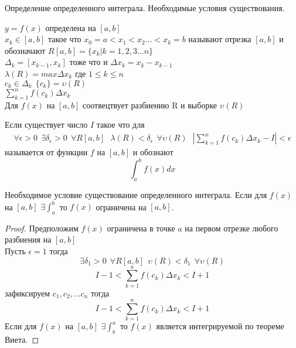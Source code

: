 \begin{title}
  Определение определенного интеграла. Необходимые условия существования.
\end{title}

$y = f(x)$ определена на $[a,b]$\\
$x_k \in [a,b]$ такое что $x_0 = a < x_1 < x_2 \ldots < x_k = b$ называют
 отрезка $[a,b]$ и обозначают $R[a,b] =
\{x_k | k = 1,2,3 \ldots n\}$\\
$\Delta_k = [x_{k-1}, x_k]$ тоже что и $\Delta{x_k} = x_k - x_{k-1}$\\
$\lambda(R) = max\Delta x_k$ где $1 \le k \le n$ \\
$c_k \in \Delta_k ~~ \{c_k\} = \upsilon(R)$ \\
$\sum_{k=1}^{n} f(c_k)\Delta x_k$ \\

Для $f(x)$ на $[a,b]$ соотвецтвует разбиению R и выборке $\upsilon(R)$\\

\begin{defin}
  Если существует число $I$ такое что для
  \begin{eqnarray*}
    \forall\epsilon>0 ~~ \exists\delta_{\epsilon}>0 ~~ \forall R[a,b] ~~~
    \lambda(R)<\delta_{\epsilon} ~~ \forall\upsilon(R) ~~~
    \left| \sum_{k=1}^{n} f(c_k)\Delta x_k - I \right| < \epsilon
  \end{eqnarray*}
  называется  от функции $f$ на $[a,b]$ и обознают
  $$\int_{a}^{b} f(x)dx$$
\end{defin}

\begin{theorem}
  Необходимое условие существование определенного интеграла. Если для $f(x)$
  на $[a,b]$ $\exists \int_{a}^{b}$ то $f(x)$ ограничена на $[a,b]$.
\end{theorem}

\begin{proof}
  Предположим $f(x)$ ограничена в точке $a$ на первом отрезке любого разбиения
  на $[a,b]$\\
  Пусть $\epsilon = 1$ тогда \[\exists \delta_1 > 0 ~~ \forall R[a,b] ~~
  \upsilon(R) < \delta_1 ~~ \forall \upsilon(R)\]
  \[I-1 < \sum_{k=1}^{n} f(c_k)\Delta x_k < I+1\] зафиксируем $c_1, c_2, \ldots c_n$
  тогда \[I-1 < \sum_{k=1}^{n} f(c_k)\Delta x_k < I+1\]
  Если для $f(x)$ на $[a,b]$ $\exists \int_{b}^{a}$ то $f(x)$
  является интегрируемой по теореме Виета.
\end{proof}